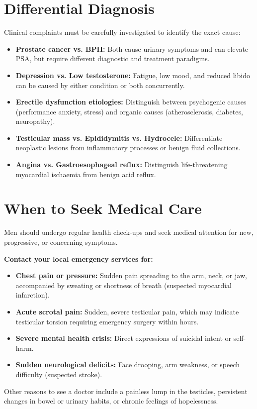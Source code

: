\section*{Differential Diagnosis}
Clinical complaints must be carefully investigated to identify the exact cause:
\begin{itemize}
    \item \textbf{Prostate cancer vs. BPH:} Both cause urinary symptoms and can elevate PSA, but require different diagnostic and treatment paradigms.
    \item \textbf{Depression vs. Low testosterone:} Fatigue, low mood, and reduced libido can be caused by either condition or both concurrently.
    \item \textbf{Erectile dysfunction etiologies:} Distinguish between psychogenic causes (performance anxiety, stress) and organic causes (atherosclerosis, diabetes, neuropathy).
    \item \textbf{Testicular mass vs. Epididymitis vs. Hydrocele:} Differentiate neoplastic lesions from inflammatory processes or benign fluid collections.
    \item \textbf{Angina vs. Gastroesophageal reflux:} Distinguish life-threatening myocardial ischaemia from benign acid reflux.
\end{itemize}

\section*{When to Seek Medical Care}
Men should undergo regular health check-ups and seek medical attention for new, progressive, or concerning symptoms.

\textbf{Contact your local emergency services for:}
\begin{itemize}
    \item \textbf{Chest pain or pressure:} Sudden pain spreading to the arm, neck, or jaw, accompanied by sweating or shortness of breath (suspected myocardial infarction).
    \item \textbf{Acute scrotal pain:} Sudden, severe testicular pain, which may indicate testicular torsion requiring emergency surgery within hours.
    \item \textbf{Severe mental health crisis:} Direct expressions of suicidal intent or self-harm.
    \item \textbf{Sudden neurological deficits:} Face drooping, arm weakness, or speech difficulty (suspected stroke).
\end{itemize}
Other reasons to see a doctor include a painless lump in the testicles, persistent changes in bowel or urinary habits, or chronic feelings of hopelessness.

